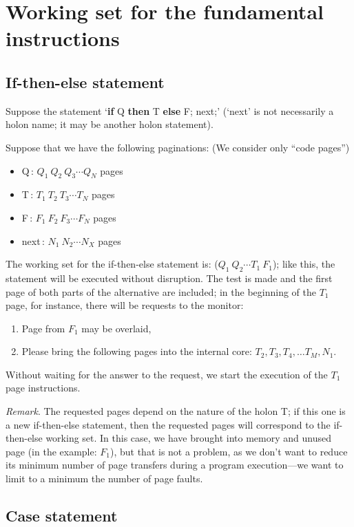 \documentclass[openany,nobib]{tufte-book}
\newcommand{\kw}[1]{{\bf #1}}
\begin{document}
\section{Working set for the fundamental instructions}

\subsection{If-then-else statement}

Suppose the statement `\kw{if} Q \kw{then} T \kw{else} F; next;' (`next' is not
necessarily
a holon name; it may be another holon statement).

Suppose that we have the following paginations: (We consider only ``code
pages'')
\begin{itemize}
    \item[] Q\,: $Q_1\ Q_2\ Q_3\cdots Q_N$ pages
    \item[] T\,: $T_1\ T_2\ T_3\cdots T_N$ pages
    \item[] F\,: $F_1\ F_2\ F_3\cdots F_N$ pages
    \item[] next\,: $N_1\ N_2\cdots N_X$ pages
\end{itemize}
The working set for the if-then-else statement is: ($Q_1\ Q_2\cdots T_1\ F_1$);
like this, the statement will be executed without disruption. The test is made
and the first page of both parts of the alternative are included; in the
beginning of the $T_1$ page, for instance, there will be requests to the
monitor:
\begin{enumerate}
    \item Page from $F_1$ may be overlaid,
    \item Please bring the following pages into the internal core:
$T_2,\allowbreak T_3,\allowbreak T_4,\ldots\allowbreak T_M,\allowbreak N_1$.
\end{enumerate}
Without waiting for the answer to the request, we start the execution of the
$T_1$ page instructions.

\medskip\noindent
{\sl Remark}. The requested pages depend on the nature of the holon T; if this
one is a new if-then-else statement, then the requested pages will correspond
to the if-then-else working set. In this case, we have brought into memory and
unused page (in the example: $F_1$), but that is not a problem, as we don't
want to reduce its minimum number of page transfers during a program
execution---we want to limit to a minimum the number of page faults.

\subsection{Case statement}
\end{document}
